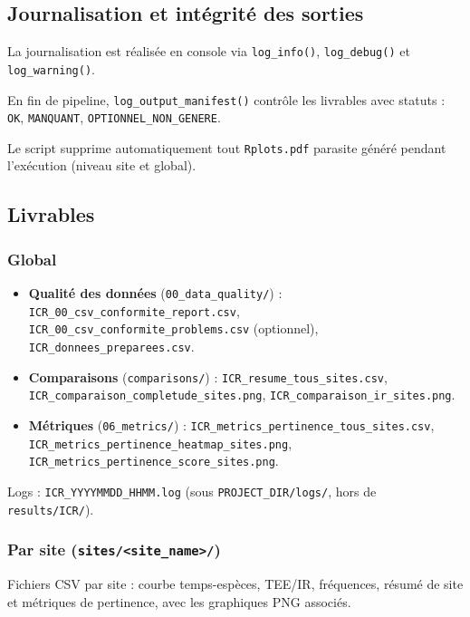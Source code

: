 \documentclass[11pt,a4paper]{article}
\begin{document}
\subsection{Journalisation et intégrité des sorties}
La journalisation est réalisée en console via \texttt{log\_info()}, \texttt{log\_debug()} et \texttt{log\_warning()}.

En fin de pipeline, \texttt{log\_output\_manifest()} contr\^ole les livrables avec statuts :
\texttt{OK}, \texttt{MANQUANT}, \texttt{OPTIONNEL\_NON\_GENERE}.

Le script supprime automatiquement tout \texttt{Rplots.pdf} parasite généré pendant l'exécution (niveau site et global).

\subsection{Livrables}
\subsubsection{Global}
\begin{itemize}
  \item \textbf{Qualité des données} (\texttt{00\_data\_quality/}) :
  \texttt{ICR\_00\_csv\_conformite\_report.csv},
  \texttt{ICR\_00\_csv\_conformite\_problems.csv} (optionnel),
  \texttt{ICR\_donnees\_preparees.csv}.

  \item \textbf{Comparaisons} (\texttt{comparisons/}) :
  \texttt{ICR\_resume\_tous\_sites.csv},
  \texttt{ICR\_comparaison\_completude\_sites.png},
  \texttt{ICR\_comparaison\_ir\_sites.png}.

  \item \textbf{Métriques} (\texttt{06\_metrics/}) :
  \texttt{ICR\_metrics\_pertinence\_tous\_sites.csv},
  \texttt{ICR\_metrics\_pertinence\_heatmap\_sites.png},
  \texttt{ICR\_metrics\_pertinence\_score\_sites.png}.
\end{itemize}

Logs : \texttt{ICR\_YYYYMMDD\_HHMM.log} (sous \texttt{PROJECT\_DIR/logs/}, hors de \texttt{results/ICR/}).

\subsubsection{Par site (\texttt{sites/<site\_name>/})}
Fichiers CSV par site : courbe temps-espèces, TEE/IR, fréquences,
résumé de site et métriques de pertinence, avec les graphiques PNG associés.
\end{document}
